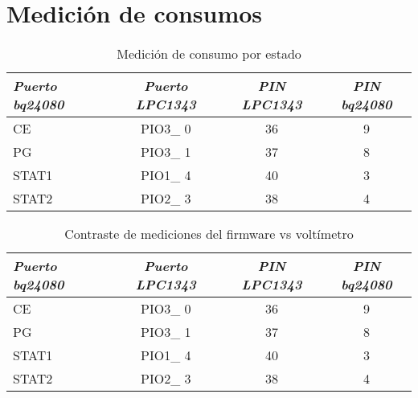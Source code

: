

\section{Medición de consumos}
\label{sec:Medición}

\begin{table}[ht]
	\centering
	\caption{Medición de consumo por estado}
	\begin{tabular}{@{} l *3c @{}}    \toprule
		\emph{\textbf{Puerto bq24080}} & \emph{\textbf{Puerto LPC1343}} & \emph{\textbf{PIN LPC1343}} & \emph{\textbf{PIN bq24080}}\\
		\midrule
		CE &  PIO3\_ 0 & 36 & 9	\\	
		PG	&  PIO3\_ 1 & 37 & 8\\
		STAT1 &  PIO1\_ 4 & 40 & 3\\
		STAT2 &  PIO2\_ 3 & 38 & 4\\
		\bottomrule
		\hline
	\end{tabular}
	\label{tab:bq}
\end{table}


\begin{table}[ht]
	\centering
	\caption{Contraste de mediciones del firmware vs voltímetro}
	\begin{tabular}{@{} l *3c @{}}    \toprule
		\emph{\textbf{Puerto bq24080}} & \emph{\textbf{Puerto LPC1343}} & \emph{\textbf{PIN LPC1343}} & \emph{\textbf{PIN bq24080}}\\
		\midrule
		CE &  PIO3\_ 0 & 36 & 9	\\	
		PG	&  PIO3\_ 1 & 37 & 8\\
		STAT1 &  PIO1\_ 4 & 40 & 3\\
		STAT2 &  PIO2\_ 3 & 38 & 4\\
		\bottomrule
		\hline
	\end{tabular}
	\label{tab:bq}
\end{table}
